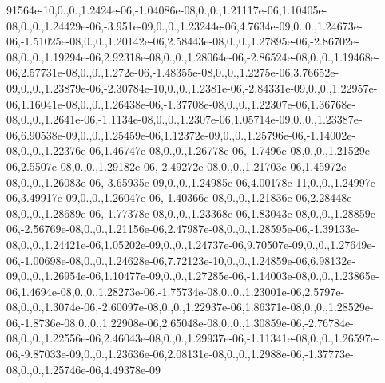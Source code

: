 \begin{DoxyCompactItemize}
91564e-\/10,0.,0.,1.\-2424e-\/06,-\/1.\-04086e-\/08,0.,0.,1.\-21117e-\/06,1.\-10405e-\/08,0.,0.,1.\-24429e-\/06,-\/3.\-951e-\/09,0.,0.,1.\-23244e-\/06,4.\-7634e-\/09,0.,0.,1.\-24673e-\/06,-\/1.\-51025e-\/08,0.,0.,1.\-20142e-\/06,2.\-58443e-\/08,0.,0.,1.\-27895e-\/06,-\/2.\-86702e-\/08,0.,0.,1.\-19294e-\/06,2.\-92318e-\/08,0.,0.,1.\-28064e-\/06,-\/2.\-86524e-\/08,0.,0.,1.\-19468e-\/06,2.\-57731e-\/08,0.,0.,1.\-272e-\/06,-\/1.\-48355e-\/08,0.,0.,1.\-2275e-\/06,3.\-76652e-\/09,0.,0.,1.\-23879e-\/06,-\/2.\-30784e-\/10,0.,0.,1.\-2381e-\/06,-\/2.\-84331e-\/09,0.,0.,1.\-22957e-\/06,1.\-16041e-\/08,0.,0.,1.\-26438e-\/06,-\/1.\-37708e-\/08,0.,0.,1.\-22307e-\/06,1.\-36768e-\/08,0.,0.,1.\-2641e-\/06,-\/1.\-1134e-\/08,0.,0.,1.\-2307e-\/06,1.\-05714e-\/09,0.,0.,1.\-23387e-\/06,6.\-90538e-\/09,0.,0.,1.\-25459e-\/06,1.\-12372e-\/09,0.,0.,1.\-25796e-\/06,-\/1.\-14002e-\/08,0.,0.,1.\-22376e-\/06,1.\-46747e-\/08,0.,0.,1.\-26778e-\/06,-\/1.\-7496e-\/08,0.,0.,1.\-21529e-\/06,2.\-5507e-\/08,0.,0.,1.\-29182e-\/06,-\/2.\-49272e-\/08,0.,0.,1.\-21703e-\/06,1.\-45972e-\/08,0.,0.,1.\-26083e-\/06,-\/3.\-65935e-\/09,0.,0.,1.\-24985e-\/06,4.\-00178e-\/11,0.,0.,1.\-24997e-\/06,3.\-49917e-\/09,0.,0.,1.\-26047e-\/06,-\/1.\-40366e-\/08,0.,0.,1.\-21836e-\/06,2.\-28448e-\/08,0.,0.,1.\-28689e-\/06,-\/1.\-77378e-\/08,0.,0.,1.\-23368e-\/06,1.\-83043e-\/08,0.,0.,1.\-28859e-\/06,-\/2.\-56769e-\/08,0.,0.,1.\-21156e-\/06,2.\-47987e-\/08,0.,0.,1.\-28595e-\/06,-\/1.\-39133e-\/08,0.,0.,1.\-24421e-\/06,1.\-05202e-\/09,0.,0.,1.\-24737e-\/06,9.\-70507e-\/09,0.,0.,1.\-27649e-\/06,-\/1.\-00698e-\/08,0.,0.,1.\-24628e-\/06,7.\-72123e-\/10,0.,0.,1.\-24859e-\/06,6.\-98132e-\/09,0.,0.,1.\-26954e-\/06,1.\-10477e-\/09,0.,0.,1.\-27285e-\/06,-\/1.\-14003e-\/08,0.,0.,1.\-23865e-\/06,1.\-4694e-\/08,0.,0.,1.\-28273e-\/06,-\/1.\-75734e-\/08,0.,0.,1.\-23001e-\/06,2.\-5797e-\/08,0.,0.,1.\-3074e-\/06,-\/2.\-60097e-\/08,0.,0.,1.\-22937e-\/06,1.\-86371e-\/08,0.,0.,1.\-28529e-\/06,-\/1.\-8736e-\/08,0.,0.,1.\-22908e-\/06,2.\-65048e-\/08,0.,0.,1.\-30859e-\/06,-\/2.\-76784e-\/08,0.,0.,1.\-22556e-\/06,2.\-46043e-\/08,0.,0.,1.\-29937e-\/06,-\/1.\-11341e-\/08,0.,0.,1.\-26597e-\/06,-\/9.\-87033e-\/09,0.,0.,1.\-23636e-\/06,2.\-08131e-\/08,0.,0.,1.\-2988e-\/06,-\/1.\-37773e-\/08,0.,0.,1.\-25746e-\/06,4.\-49378e-\/09
\end{DoxyCompactItemize}
